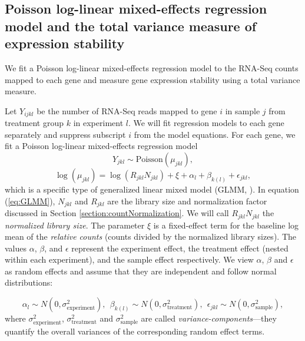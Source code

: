 \documentclass[letterpaper,12pt]{article}
\begin{document}
\subsection{Poisson log-linear mixed-effects regression model and the total
	variance measure of expression stability}\label{subsection:OurMethod} 
We fit a Poisson log-linear mixed-effects regression model to the
RNA-Seq counts mapped to each gene and measure gene expression stability using
a total variance measure.

Let $Y_{ijkl}$ be the number of RNA-Seq reads mapped to gene
$i$ in sample $j$ from treatment group $k$  in experiment $l$. We will fit
regression models to each gene separately and suppress subscript $i$ from the
model equations.  For each gene, we fit a Poisson log-linear mixed-effects regression model 
\begin{equation}
Y_{jkl} \sim \text{Poisson}(\mu_{jkl}),
\end{equation}
\begin{equation}\label{eq:GLMM}
\log( \mu_{jkl}) = \log(R_{jkl}N_{jkl})+ \xi + \alpha_l + \beta_{k(l)} + \epsilon_{jkl},
\end{equation}
which is a specific type of generalized linear mixed model (GLMM, 
\citet{mcculloch2001generalized}). 
In equation (\ref{eq:GLMM}), $N_{jkl}$ and $R_{jkl}$ are the library size and normalization factor 
discussed in
Section \ref{section:countNormalization}. We will call $R_{jkl}N_{jkl}$ 
the \textit{normalized library size}.
The parameter $\xi$ is a fixed-effect term for the baseline log mean of the {\em relative
	counts} (counts divided by the normalized library sizes). 
The values $\alpha$, $\beta$, and $\epsilon$ %
represent the experiment effect, the treatment effect (nested within each
experiment), and the sample effect respectively. 
We view  $\alpha$, $\beta$ and $\epsilon$ as random effects and assume that
they are independent and follow normal distributions:

\begin{equation}\label{eq:normalassumption}
\alpha_l\sim N(0, \sigma^2_{\text{experiment}}),~~
\beta_{k(l)}\sim N(0, \sigma^2_{\text{treatment}}),~~
\epsilon_{jkl}\sim N(0, \sigma_{\text{sample}}^2),
\end{equation}
where $\sigma_{\text{experiment}}^2$, $\sigma_{\text{treatment}}^2$ and
$\sigma_{\text{sample}}^2$ are called \textit{variance-components}---they
quantify the overall variances of the corresponding random effect terms. 
\end{document}
